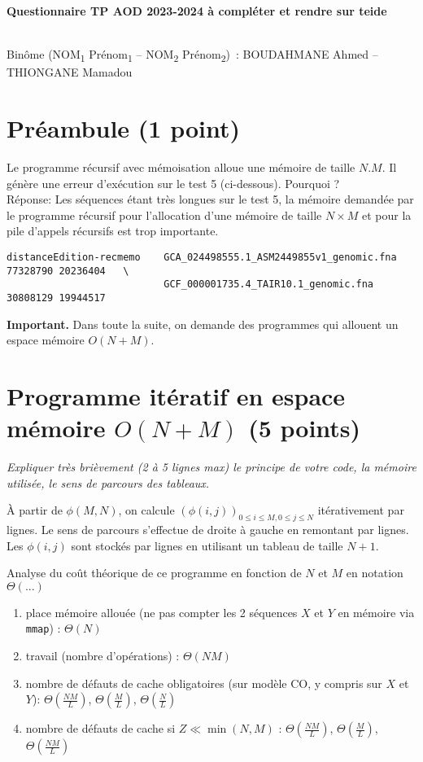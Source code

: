 \documentclass[10pt,a4paper]{article}
\begin{document}
\thispagestyle{empty}

\noindent\centerline{\bf\large Questionnaire  TP AOD 2023-2024 à compléter et rendre sur teide  } \\
Binôme 
(NOM\textsubscript{1} Prénom\textsubscript{1} --
 NOM\textsubscript{2} Prénom\textsubscript{2})
\,: BOUDAHMANE Ahmed -- THIONGANE Mamadou

\section{Préambule (1 point)}
Le programme récursif avec mémoisation alloue une mémoire de taille $N.M$.
Il génère une erreur d'exécution sur le test 5 (ci-dessous). Pourquoi ? \\
Réponse: Les séquences étant très longues sur le test 5, la mémoire demandée par le programme récursif pour l'allocation d'une mémoire de taille $N \times M$ et pour la pile d'appels récursifs est trop importante.
\begin{verbatim}
distanceEdition-recmemo    GCA_024498555.1_ASM2449855v1_genomic.fna 77328790 20236404   \
                           GCF_000001735.4_TAIR10.1_genomic.fna 30808129 19944517 
\end{verbatim}

{\noindent\bf{Important}.} Dans toute la suite, on demande des programmes qui allouent un espace mémoire $O(N+M)$.

\section{Programme itératif en espace mémoire $O(N+M)$ (5 points)}
{\em Expliquer très brièvement (2 à 5 lignes max) le principe de votre code, la mémoire utilisée, le sens de parcours des tableaux.}

\medskip

À partir de $\phi(M,N)$, on calcule $\left( \phi(i,j) \right)_{0 \leqslant i \leqslant M, 0 \leqslant j \leqslant N}$ itérativement par lignes. Le sens de parcours s'effectue de droite à gauche en remontant par lignes. Les $\phi(i,j)$ sont stockés par lignes en utilisant un tableau de taille $N+1$.

\medskip

Analyse du coût théorique de ce  programme en fonction de $N$ et $M$  en notation $\Theta(...)$ 
\begin{enumerate}
  \item place mémoire allouée (ne pas compter les 2 séquences $X$ et $Y$ en mémoire via {\tt mmap}) : $\Theta(N)$
  \item travail (nombre d'opérations) : $\Theta(NM)$
  \item nombre de défauts de cache obligatoires (sur modèle CO, y compris sur $X$ et $Y$): $\Theta \left( \frac{NM}{L} \right)$, $\Theta \left( \frac{M}{L} \right)$, $\Theta \left( \frac{N}{L} \right)$
  \item nombre de défauts de cache si $Z \ll \min(N,M)$ : $\Theta \left( \frac{NM}{L} \right)$, $\Theta \left( \frac{M}{L} \right)$, $\Theta \left( \frac{NM}{L} \right)$
\end{enumerate}
\end{document}
